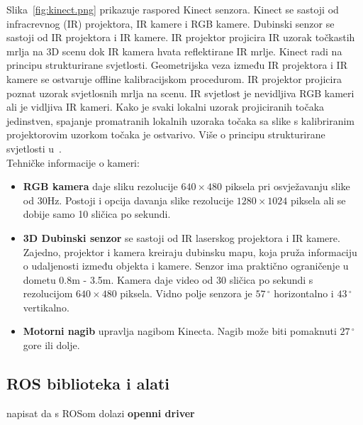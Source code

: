Slika~\ref{fig:kinect.png} prikazuje raspored Kinect senzora. Kinect se
sastoji od infracrevnog (IR) projektora, IR kamere i RGB kamere.
Dubinski senzor se sastoji od IR projektora i IR kamere. IR projektor
projicira IR uzorak točkastih mrlja na 3D scenu dok IR kamera hvata
reflektirane IR mrlje. Kinect radi na principu strukturirane svjetlosti.
Geometrijska veza između IR projektora i IR kamere se ostvaruje offline
kalibracijskom procedurom. IR projektor projicira poznat uzorak
svjetlosnih mrlja na scenu. IR svjetlost je nevidljiva RGB kameri ali
je vidljiva IR kameri. Kako je svaki lokalni uzorak projiciranih točaka
jedinstven, spajanje promatranih lokalnih uzoraka točaka sa slike
s kalibriranim projektorovim uzorkom točaka je ostvarivo. Više o
principu strukturirane svjetlosti u~\cite{structured:light}.\\

Tehničke informacije o kameri:
\begin{itemize}
    \item \textbf{RGB kamera} daje sliku rezolucije \(640\times480\)
        piksela pri osvježavanju slike od 30Hz. Postoji i opcija davanja
        slike rezolucije \(1280 \times 1024\) piksela ali se dobije samo 10
        sličica po sekundi.
    \item \textbf{3D Dubinski senzor} se sastoji od IR laserskog
        projektora i IR kamere. Zajedno, projektor i kamera kreiraju
        dubinsku mapu, koja pruža informaciju o udaljenosti između
        objekta i kamere. Senzor ima praktično ograničenje u dometu 
        0.8m - 3.5m. Kamera daje video od 30 sličica po sekundi s
        rezolucijom \(640 \times 480\) piksela. Vidno polje senzora je
        \(57\,^{\circ}\) horizontalno i \(43\,^{\circ}\) vertikalno.
    \item \textbf{Motorni nagib} upravlja nagibom Kinecta. Nagib može
        biti pomaknuti \(27\,^{\circ}\) gore ili dolje.
\end{itemize}



\newpage
\subsection{ROS biblioteka i alati} %
\label{sub:ROS biblioteka i alati}

napisat da s ROSom dolazi \textbf{ openni driver} 

